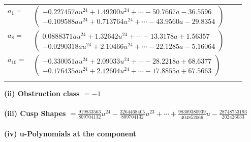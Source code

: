 \documentclass[1p]{elsarticle_modified}
\theoremstyle{definition}
\begin{document}
\begin{tabular}{m{7pt} m{180pt} m{7pt} m{180pt} }
\flushright $a_{1}=$&$\begin{pmatrix}-0.227457 a u^{24}+1.49200 u^{24}+\cdots-50.7667 a-36.5596\\-0.109588 a u^{24}+0.713764 u^{24}+\cdots-43.9560 a-29.8354\end{pmatrix}$ \\
\flushright $a_{8}=$&$\begin{pmatrix}0.0888371 a u^{24}+1.32642 u^{24}+\cdots-13.3178 a+1.56357\\-0.0290318 a u^{24}+2.10466 u^{24}+\cdots-22.1285 a-5.16064\end{pmatrix}$ \\
\flushright $a_{10}=$&$\begin{pmatrix}-0.330051 a u^{24}+2.09033 u^{24}+\cdots-28.2218 a+68.6377\\-0.176435 a u^{24}+2.12604 u^{24}+\cdots-17.8855 a+67.5663\end{pmatrix}$\\&\end{tabular}
\flushleft \textbf{(ii) Obstruction class $= -1$}\\~\\
\flushleft \textbf{(iii) Cusp Shapes $= \frac{919833563}{809704132} u^{24}-\frac{3264468405}{809704132} u^{23}+\cdots+\frac{98309380939}{404852066} u-\frac{28748753193}{202426033}$}\\~\\
\newpage\renewcommand{\arraystretch}{1}
\flushleft \textbf{(iv) u-Polynomials at the component}\newline \\
\end{document}
